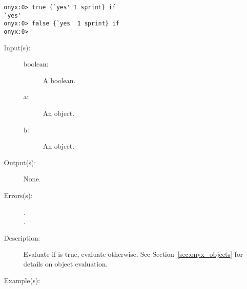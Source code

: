 \begin{description}
\begin{description}
\begin{verbatim}
onyx:0> true {`yes' 1 sprint} if
`yes'
onyx:0> false {`yes' 1 sprint} if
onyx:0>
		\end{verbatim}
	\end{description}
\label{systemdict:ifelse}
\item[{\onyxop{boolean a b}{ifelse}{--}}: ]
	\begin{description}\item[]
	\item[Input(s): ]
		\begin{description}\item[]
		\item[boolean: ]
			A boolean.
		\item[a: ]
			An object.
		\item[b: ]
			An object.
		\end{description}
	\item[Output(s): ] None.
	\item[Errors(s): ]
		\begin{description}\item[]
		\item[.]
		\item[.]
		\end{description}
	\item[Description: ]
		Evaluate  if  is true, evaluate
		 otherwise.  See Section~\ref{sec:onyx_objects} for
		details on object evaluation.
	\item[Example(s): ]\begin{verbatim}


\end{verbatim}
\end{description}
\end{description}
